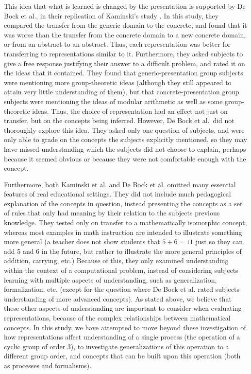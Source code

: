 \documentclass[man,10pt]{apa6}
\begin{document}
This idea that what is learned is changed by the presentation is supported by De Bock et al., in their replication of Kaminski's study \cite{DeBock2011}. In this study, they compared the transfer from the generic domain to the concrete, and found that it was worse than the transfer from the concrete domain to a new concrete domain, or from an abstract to an abstract. Thus, each representation was better for transferring to representations similar to it. Furthermore, they asked subjects to give a free response justifying their answer to a difficult problem, and rated it on the ideas that it contained. They found that generic-presentation group subjects were mentioning more group-theoretic ideas (although they still appeared to attain very little understanding of them), but that concrete-presentation group subjects were mentioning the ideas of modular arithmetic as well as some group-theoretic ideas. Thus, the choice of representation had an effect not just on transfer, but on the concepts being inferred. However, De Bock et al.\ did not thoroughly explore this idea. They asked only one question of subjects, and were only able to grade on the concepts the subjects explicitly mentioned, so they may have missed understanding which the subjects did not choose to explain, perhaps because it seemed obvious or because they were not comfortable enough with the concept.\par
Furthermore, both Kaminski et al. and De Bock et al. omitted many essential features of real educational settings. They did not include much pedagogical explanation of the concepts in question, instead presenting the concepts as a set of rules that only had meaning by their relation to the subjects previous knowledge. They tested only on transfer to a mathematically isomorphic concept, whereas most examples in math instruction are intended to illustrate something more general (a teacher does not show students that $5+6 = 11$ just so they can add 5 and 6 in the future, but rather to illustrate the more general principles of addition, carrying, etc.) Because of this, they only examined understanding within the context of a computational problem, instead of considering subjects learning with multiple aspects of understanding, such as generalization, formalization, etc. (except for the question where De Bock et al. rated subjects understanding of more advanced concepts). As stated above, we believe that these other aspects of understanding are important to consider when evaluating representations, because of the complex relationships between mathematical concepts. In this study, we have attempted to move beyond these investigation of how representations affect understanding of a single process (the operation of a cyclic group of order 3), to investigate generalizations of this operation to a different group order, and concepts that can be built upon this operation (both as processes and formalisms). 
\end{document}

